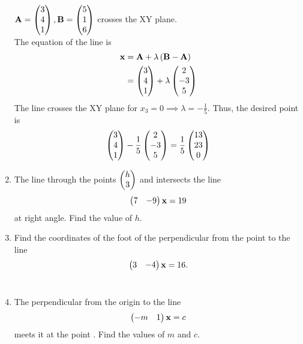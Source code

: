 \documentclass[journal,12pt,twocolumn]{IEEEtran}
\renewcommand\thesection{\arabic{section}}
\begin{document}
\begin{enumerate}[label=\thesection.\arabic*.,ref=\thesection.\theenumi]
$
\mathbf{A}=\begin{pmatrix}3\\4\\1\end{pmatrix}, 
\mathbf{B}=\begin{pmatrix}5\\1\\6\end{pmatrix}
$
crosses the XY plane.
%
\\
\solution The equation of the line is 
%
\begin{align}
\mathbf{x} &= \mathbf{A}+\lambda\left(\mathbf{B}-\mathbf{A}\right)
\\
&= \begin{pmatrix}3\\4\\1\end{pmatrix} + \lambda \begin{pmatrix}2\\-3\\5\end{pmatrix}
\end{align}
%
The line  crosses the XY plane for $x_3 = 0 \implies \lambda = -\frac{1}{5}$. Thus, the desired point is
%
\begin{align}
 \begin{pmatrix}3\\4\\1\end{pmatrix} -\frac{1}{5}\begin{pmatrix}2\\-3\\5\end{pmatrix} = \frac{1}{5}\begin{pmatrix}13\\23\\0\end{pmatrix}
\end{align}
%
\item The line through the points $\begin{pmatrix}h\\3\end{pmatrix}$ and  intersects the line 
\begin{align}
\begin{pmatrix}7 & -9\end{pmatrix}\mathbf{x} = 19
\end{align}
at right angle.  Find the value of $h$.
\\
\solution
%
\item Find the coordinates of the foot of the perpendicular from the point  to the line
%
\begin{align}
\begin{pmatrix}3 & -4\end{pmatrix}\mathbf{x} = 16.
\end{align}
%
\\
\solution
%
\item The perpendicular from the origin to the line
\begin{align}
\begin{pmatrix}-m & 1\end{pmatrix}\mathbf{x} = c
\end{align}
%
meets it at the point .  Find the values of $m$ and $c$.
\\
\solution
%
%


\end{enumerate}
\end{document}
